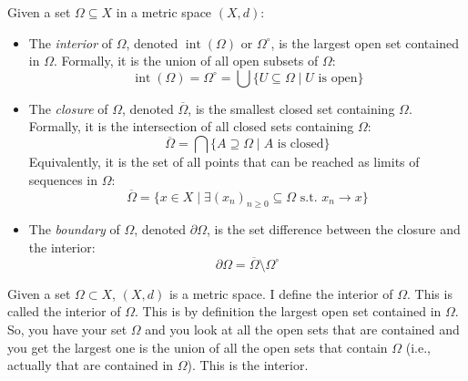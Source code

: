 
\begin{spoken-clean}[00:00:00 - 00:01:32]
\end{spoken-clean}

\begin{math-stroke}
\setcounter{theorem}{44}
\begin{definition}\label{def:interior-closure-boundary}
Given a set $\Omega \subseteq X$ in a metric space $(X, d)$:
\begin{itemize}
    \setcounter{enumi}{0} \item The \emph{interior} of $\Omega$, denoted $\operatorname{int}(\Omega)$ or $\Omega^\circ$, is the largest open set contained in $\Omega$. Formally, it is the union of all open subsets of $\Omega$:
    \[ \operatorname{int}(\Omega) = \Omega^\circ = \bigcup \{ U \subseteq \Omega \mid U \text{ is open} \} \]
    \item The \emph{closure} of $\Omega$, denoted $\overline{\Omega}$, is the smallest closed set containing $\Omega$. Formally, it is the intersection of all closed sets containing $\Omega$:
    \[ \overline{\Omega} = \bigcap \{ A \supseteq \Omega \mid A \text{ is closed} \} \]
    Equivalently, it is the set of all points that can be reached as limits of sequences in $\Omega$:
    \[ \overline{\Omega} = \{ x \in X \mid \exists (x_n)_{n \ge 0} \subseteq \Omega \text{ s.t. } x_n \to x \} \]
    \item The \emph{boundary} of $\Omega$, denoted $\partial \Omega$, is the set difference between the closure and the interior:
    \[ \partial \Omega = \overline{\Omega} \setminus \Omega^\circ \]
\end{itemize}
\end{definition}
\end{math-stroke}

\begin{spoken-clean}[00:01:32 - 00:02:29]
Given a set $\Omega \subset X$, $(X, d)$ is a metric space. I define the interior of $\Omega$. This is called the interior of $\Omega$. This is by definition the largest open set contained in $\Omega$. So, you have your set $\Omega$ and you look at all the open sets that are contained and you get the largest one is the union of all the open sets that contain $\Omega$ (i.e., actually that are contained in $\Omega$). This is the interior.
\end{spoken-clean}

